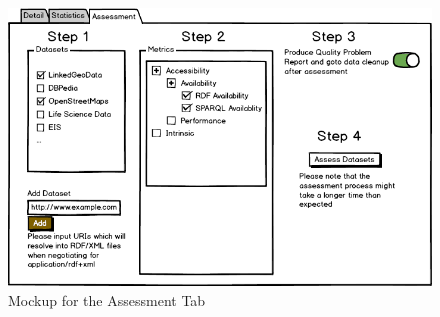 \begin{figure}[tbph]
\center
\includegraphics[width=\textwidth]{images/uiAssessmentTab.png} 
\caption{Mockup for the Assessment Tab} 
\label{fig:uiAssessementTab}
\end{figure}

